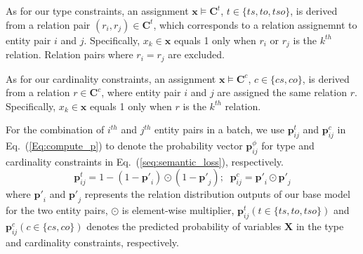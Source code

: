 
As for our type constraints, an assignment $\bm x \models \bm{C}^t$, $t\in\{ts,to,tso\}$, is derived from a relation pair $(r_i, r_j) \in \bm{C}^{t}$, which corresponds to a relation assignemnt to entity pair $i$ and $j$.
Specifically, $x_k\in \bm{x}$ equals 1 only when $r_i$ or $r_j$ is the $k^{th}$ relation.
Relation pairs where $r_i=r_j$ are excluded.

As for our cardinality constraints, an assignment $\bm x \models \bm{C}^c$, $c\in\{cs,co\}$, is derived from a relation $r \in \bm{C}^{c}$, where entity pair $i$ and $j$ are assigned the same relation $r$.
Specifically, $x_k\in \bm{x}$ equals 1 only when $r$ is the $k^{th}$ relation.

For the combination of $i^{th}$ and $j^{th}$ entity pairs in a batch, we use $\bm{p}_{ij}^{t}$ and $\bm{p}_{ij}^{c}$ in Eq.~(\ref{Eq:compute_p}) to denote the probability vector $\bm{p}^{\phi}_{ij}$ for type and cardinality constraints in Eq.~(\ref{seq:semantic_loss}), respectively.
\begin{equation}
\label{Eq:compute_p}
\bm{p}_{ij}^{t} = 1-(1-\bm{p'}_{i}) \odot (1-\bm{p'}_{j});\;\; \bm{p}_{ij}^{c} = \bm{p'}_{i} \odot \bm{p'}_{j}
\end{equation}
where $\bm{p'}_i$ and $\bm{p'}_j$ represents the relation distribution outputs of our base model for the two entity pairs,
$\odot$ is element-wise multiplier,
$\bm{p}_{ij}^{t}(t \in \{ts, to, tso\})$ and $\bm{p}_{ij}^{c}(c \in \{cs, co\})$ denotes the predicted probability of variables $\bm{X}$ in the type and cardinality constraints, respectively.

